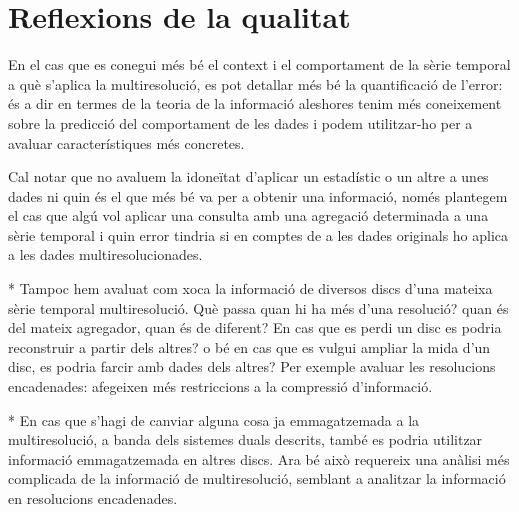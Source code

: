 \section{Reflexions de la qualitat}




En el cas que es conegui més bé el context i el comportament de la
sèrie temporal a què s'aplica la multiresolució, es pot detallar més
bé la quantificació de l'error: és a dir en termes de la teoria de
la informació aleshores tenim més coneixement sobre la predicció del
comportament de les dades i podem utilitzar-ho per a avaluar
característiques més concretes.

Cal notar que no avaluem la idoneïtat d'aplicar un estadístic o un
altre a unes dades ni quin és el que més bé va per a obtenir una
informació, només plantegem el cas que algú vol aplicar una consulta
amb una agregació determinada a una sèrie temporal i quin error
tindria si en comptes de a les dades originals ho aplica a les dades
multiresolucionades.


* Tampoc hem avaluat com xoca la informació de diversos discs d'una mateixa sèrie temporal multiresolució. Què passa quan hi ha més d'una resolució? quan és del mateix agregador, quan és de diferent?   En cas que es perdi un disc es podria reconstruir a partir dels altres? o bé en cas que es vulgui ampliar la mida d'un disc, es podria farcir amb dades dels altres? Per exemple avaluar les resolucions encadenades: afegeixen més restriccions a la compressió d'informació.

* En cas que s'hagi de canviar alguna cosa ja emmagatzemada a la
  multiresolució, a banda dels sistemes duals descrits, també es
  podria utilitzar informació emmagatzemada en altres discs. Ara bé
  això requereix una anàlisi més complicada de la informació de
  multiresolució, semblant a analitzar la informació en resolucions
  encadenades.






















